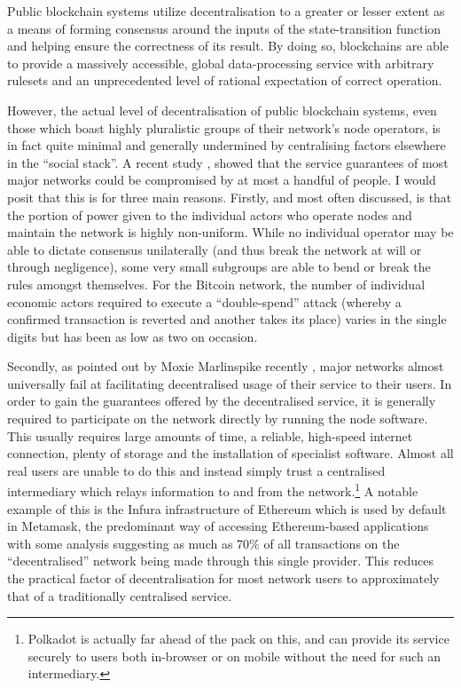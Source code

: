 \documentclass[9pt,oneside]{amsart}
\begin{document}
Public blockchain systems utilize decentralisation to a greater or lesser extent as a means of forming consensus around the inputs of the state-transition function and helping ensure the correctness of its result. By doing so, blockchains are able to provide a massively accessible, global data-processing service with arbitrary rulesets and an unprecedented level of rational expectation of correct operation.

However, the actual level of decentralisation of public blockchain systems, even those which boast highly pluralistic groups of their network's node operators, is in fact quite minimal and generally undermined by centralising factors elsewhere in the ``social stack''. A recent study \cite{sultanik2022blockchains}, showed that the service guarantees of most major networks could be compromised by at most a handful of people. I would posit that this is for three main reasons. Firstly, and most often discussed, is that the portion of power given to the individual actors who operate nodes and maintain the network is highly non-uniform. While no individual operator may be able to dictate consensus unilaterally (and thus break the network at will or through negligence), some very small subgroups are able to bend or break the rules amongst themselves. For the Bitcoin network, the number of individual economic actors required to execute a ``double-spend'' attack (whereby a confirmed transaction is reverted and another takes its place) varies in the single digits but has been as low as two on occasion.

Secondly, as pointed out by Moxie Marlinspike recently \cite{marlinspike2022my}, major networks almost universally fail at facilitating decentralised usage of their service to their users. In order to gain the guarantees offered by the decentralised service, it is generally required to participate on the network directly by running the node software. This usually requires large amounts of time, a reliable, high-speed internet connection, plenty of storage and the installation of specialist software. Almost all real users are unable to do this and instead simply trust a centralised intermediary which relays information to and from the network.\footnote{Polkadot is actually far ahead of the pack on this, and can provide its service securely to users both in-browser or on mobile without the need for such an intermediary.} A notable example of this is the Infura infrastructure of Ethereum which is used by default in Metamask, the predominant way of accessing Ethereum-based applications with some analysis suggesting as much as 70\% of all transactions on the ``decentralised'' network being made through this single provider. This reduces the practical factor of decentralisation for most network users to approximately that of a traditionally centralised service.
\end{document}
